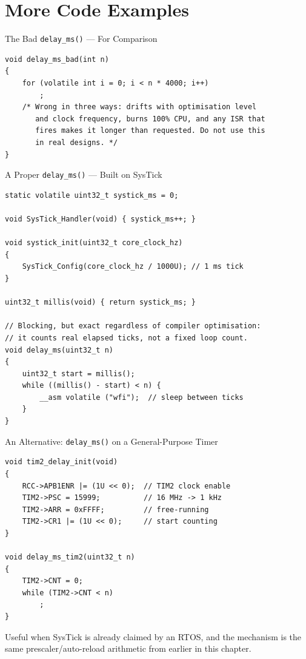 \documentclass[aspectratio=169]{beamer}
\begin{document}
\section{More Code Examples}

\begin{frame}[fragile]{The Bad \texttt{delay\_ms()} --- For Comparison}
\begin{lstlisting}
void delay_ms_bad(int n)
{
    for (volatile int i = 0; i < n * 4000; i++)
        ;
    /* Wrong in three ways: drifts with optimisation level
       and clock frequency, burns 100% CPU, and any ISR that
       fires makes it longer than requested. Do not use this
       in real designs. */
}
\end{lstlisting}
\end{frame}

\begin{frame}[fragile]{A Proper \texttt{delay\_ms()} --- Built on SysTick}
\begin{lstlisting}
static volatile uint32_t systick_ms = 0;

void SysTick_Handler(void) { systick_ms++; }

void systick_init(uint32_t core_clock_hz)
{
    SysTick_Config(core_clock_hz / 1000U); // 1 ms tick
}

uint32_t millis(void) { return systick_ms; }

// Blocking, but exact regardless of compiler optimisation:
// it counts real elapsed ticks, not a fixed loop count.
void delay_ms(uint32_t n)
{
    uint32_t start = millis();
    while ((millis() - start) < n) {
        __asm volatile ("wfi");  // sleep between ticks
    }
}
\end{lstlisting}
\end{frame}

\begin{frame}[fragile]{An Alternative: \texttt{delay\_ms()} on a General-Purpose Timer}
\begin{lstlisting}
void tim2_delay_init(void)
{
    RCC->APB1ENR |= (1U << 0);  // TIM2 clock enable
    TIM2->PSC = 15999;          // 16 MHz -> 1 kHz
    TIM2->ARR = 0xFFFF;         // free-running
    TIM2->CR1 |= (1U << 0);     // start counting
}

void delay_ms_tim2(uint32_t n)
{
    TIM2->CNT = 0;
    while (TIM2->CNT < n)
        ;
}
\end{lstlisting}
{\small Useful when SysTick is already claimed by an RTOS, and the
mechanism is the same prescaler/auto-reload arithmetic from earlier in
this chapter.}
\end{frame}
\end{document}
